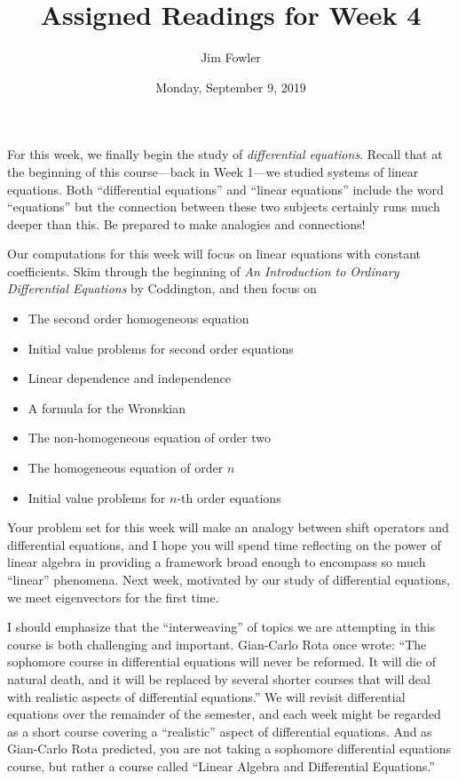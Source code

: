 \documentclass{homework}
\author{Jim Fowler}
\title{Assigned Readings for Week 4}
\date{Monday, September 9, 2019}
\begin{document}
\maketitle

For this week, we finally begin the study of \textit{differential
  equations}.  Recall that at the beginning of this course---back in
Week 1---we studied systems of linear equations.  Both ``differential
equations'' and ``linear equations'' include the word ``equations''
but the connection between these two subjects certainly runs much
deeper than this.  Be prepared to make analogies and connections!

Our computations for this week will focus on linear equations with
constant coefficients.  Skim through the beginning of \textit{An
  Introduction to Ordinary Differential Equations} by Coddington, and
then focus on
\begin{itemize}
\item {} The second order homogeneous equation
\item {} Initial value problems for second order equations
\item {} Linear dependence and independence
\item {} A formula for the Wronskian
\item {} The non-homogeneous equation of order two
\item {} The homogeneous equation of order $n$
\item {} Initial value problems for $n$-th order equations
\end{itemize}

Your problem set for this week will make an analogy between shift
operators and differential equations, and I hope you will spend time
reflecting on the power of linear algebra in providing a framework
broad enough to encompass so much ``linear'' phenomena.  Next week,
motivated by our study of differential equations, we meet eigenvectors
for the first time.

I should emphasize that the ``interweaving'' of topics we are
attempting in this course is both challenging and important.
Gian-Carlo Rota once wrote: ``The sophomore course in differential
equations will never be reformed.  It will die of natural death, and
it will be replaced by several shorter courses that will deal with
realistic aspects of differential equations.''  We will revisit
differential equations over the remainder of the semester, and each
week might be regarded as a short course covering a ``realistic''
aspect of differential equations.  And as Gian-Carlo Rota predicted,
you are not taking a sophomore differential equations course, but
rather a course called ``Linear Algebra and Differential Equations.''
\end{document}
